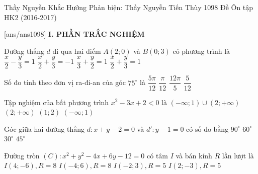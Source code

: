 \begin{name}
{Thầy Nguyễn Khắc Hưởng \newline Phản biện: Thầy Nguyễn Tiến Thùy}
{1098 Đề Ôn tập HK2 (2016-2017)}%
	\end{name}
	\setcounter{ex}{0}\setcounter{bt}{0}
	[ans/ans1098]
\noindent\textbf{I. PHẦN TRẮC NGHIỆM}
\begin{ex}%
Đường thẳng $d$ đi qua hai điểm $A(2;0)$ và $B(0;3)$ có phương trình là
	\choice
	{$\dfrac{x}{2}-\dfrac{y}{3}=1$}
	{$\dfrac{x}{2}+\dfrac{y}{3}=-1$}
	{$\dfrac{x}{3}+\dfrac{y}{2}=1$}
	{\True $\dfrac{x}{2}+\dfrac{y}{3}=1$}
\end{ex}

\begin{ex}%
	Số đo tính theo đơn vị ra-đi-an của góc $75^\circ$ là
	\choice
	{\True $\dfrac{5\pi}{12}$}
	{$\dfrac{\pi}{12}$}
	{$\dfrac{12\pi}{5}$}
	{$\dfrac{5}{12}$}
\end{ex}

\begin{ex}%
Tập nghiệm của bất phương trình $x^2-3x+2<0$ là
	\choice
	{$(-\infty;1)\cup (2;+\infty)$}
	{$(2;+\infty)$}
	{\True $(1;2)$}
	{$(-\infty;1)$}
\end{ex}

\begin{ex}%
	Góc giữa hai đường thẳng $d:x+y-2=0$ và $d':y-1=0$ có số đo bằng
	\choice
	{$90^\circ$}
	{$60^\circ$}
	{$30^\circ$}
	{\True $45^\circ$}
\end{ex}

\begin{ex}%
	Đường tròn $(C):x^2+y^2-4x+6y-12=0$ có tâm $I$ và bán kính $R$ lần lượt là
	\choice
	{$I(4;-6),R=8$}
	{$I(-4;6),R=8$}
	{$I(-2;3),R=5$}
	{\True $I(2;-3),R=5$}
\end{ex} 

